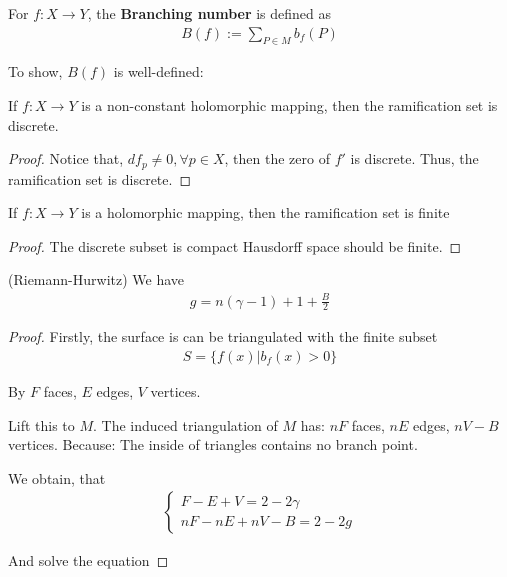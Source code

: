 \documentclass[Total.tex]{subfiles}
\begin{document}
			\begin{Def}
				For $f:X\rightarrow Y$, the \textbf{Branching number} is defined as
				\begin{gather*}
					B(f):=\sum_{P\in M} b_f(P)
				\end{gather*}
			\end{Def}
			
			To show, $B(f)$ is well-defined:
			\begin{lemma}
				If $f:X\rightarrow Y$ is a non-constant holomorphic mapping, then the ramification set is discrete. 
			\end{lemma}
			\begin{proof}
				Notice that, $df_p\not=0,\forall p\in X$, then the zero of $f'$ is discrete. Thus, the ramification set is discrete. 
			\end{proof}
			
			\begin{lemma}
				If $f:X\rightarrow Y$ is a holomorphic mapping, then the ramification set is finite
			\end{lemma}
			\begin{proof}
				The discrete subset is compact Hausdorff space should be finite. 
			\end{proof}
			
			\begin{theorem}
				(Riemann-Hurwitz) We have
				\begin{gather*}
					g=n(\gamma-1)+1+\frac{B}{2}
				\end{gather*}
			\end{theorem}
			\begin{proof}
				Firstly, the surface is can be triangulated with the finite subset
				\begin{gather*}
					S=\{f(x)|b_f(x)>0\}
				\end{gather*}
				
				By $F$ faces, $E$ edges, $V$ vertices. 
				
				Lift this to $M$. The induced triangulation of $M$ has: $nF$ faces, $nE$ edges, $nV-B$ vertices. Because: The inside of triangles contains no branch point.
				
				We obtain, that
				\begin{gather*}
					\begin{cases}
						F-E+V=2-2\gamma\\ nF-nE+nV-B=2-2g
					\end{cases}
				\end{gather*}
				
				And solve the equation
			\end{proof}
			
\end{document}
